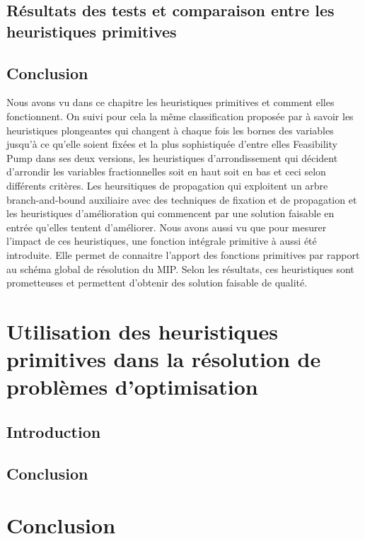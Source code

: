 \documentclass[12pt,a4paper,oneside]{book}
\theoremstyle{definition}
\begin{document}
	\section{Résultats des tests et comparaison entre les heuristiques primitives}
	
	
	
	\section{Conclusion}
	Nous avons vu dans ce chapitre les heuristiques primitives et comment elles fonctionnent. On suivi pour cela la même classification proposée par \cite{berthold2006} à savoir les heuristiques plongeantes qui changent à chaque fois les bornes des variables jusqu'à ce qu'elle soient fixées et la plus sophistiquée d'entre elles Feasibility Pump dans ses deux versions, les heuristiques d'arrondissement qui décident d'arrondir les variables fractionnelles soit en haut soit en bas et ceci selon différents critères. Les heursitiques de propagation qui exploitent un arbre branch-and-bound auxiliaire avec des techniques de fixation et de propagation et les heuristiques d'amélioration qui commencent par une solution faisable en entrée qu'elles tentent d'améliorer. Nous avons aussi vu que pour mesurer l'impact de ces heuristiques, une fonction intégrale primitive à aussi été introduite. Elle permet de connaitre l'apport des fonctions primitives par rapport au schéma global de résolution du MIP. Selon les résultats, ces heuristiques sont prometteuses et permettent d'obtenir des solution faisable de qualité. 
	
	\chapter{Utilisation des heuristiques primitives dans la résolution de problèmes d'optimisation}
	
	\section{Introduction}
	
	\section{}
	
	\section{Conclusion}
	
	\chapter*{Conclusion}
	
	
	\newpage
	
	 
	
\end{document}
